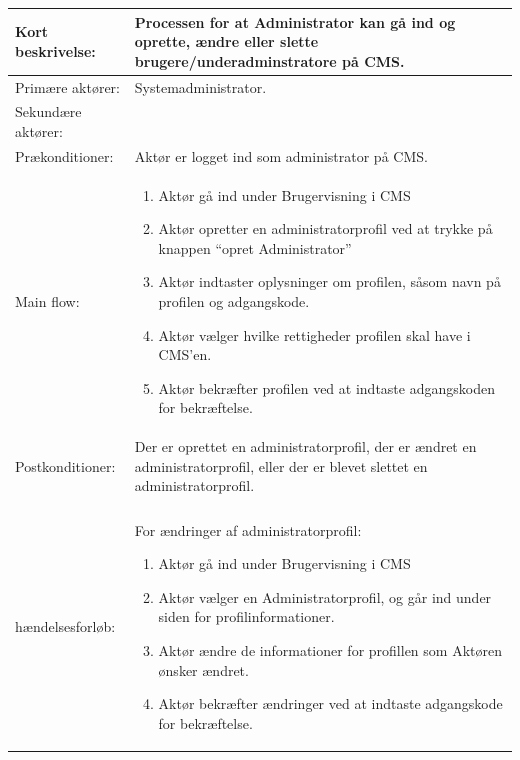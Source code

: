 \begin{table}[t]
\begin{tabular}{|p{3cm}|p{14cm}|}
        \hline
        Kort beskrivelse: & Processen for at Administrator kan gå ind og oprette, ændre eller slette brugere/underadminstratore på CMS. \\ 
        \hline
        Primære aktører: & Systemadministrator. \\ 
        \hline
        Sekundære aktører: &  \\ 
        \hline
        Prækonditioner: & Aktør er logget ind som administrator på CMS. \\ 
        \hline
        Main flow: &  
        \begin{minipage}{14cm}
        	\begin{enumerate}
        	\item Aktør gå ind under Brugervisning i CMS
            \item Aktør opretter en administratorprofil ved at trykke på knappen “opret Administrator”
            \item Aktør indtaster oplysninger om profilen, såsom navn på profilen og adgangskode.
            \item Aktør vælger hvilke rettigheder profilen skal have i CMS’en.
            \item Aktør bekræfter profilen ved at indtaste adgangskoden for bekræftelse.
        	\end{enumerate}
        \end{minipage} \par \\ 
        \hline
        Postkonditioner: & Der er oprettet en administratorprofil, der er ændret en administratorprofil, eller der er blevet slettet en administratorprofil. \\
        \hline
        \begin{minipage}{3cm} Alternative \\ hændelsesforløb:
        \end{minipage}
        & \begin{minipage}{14cm}
        	For ændringer af administratorprofil:
        	\begin{enumerate}
              \item Aktør gå ind under Brugervisning i CMS
              \item Aktør vælger en Administratorprofil, og går ind under siden for profilinformationer.
              \item Aktør ændre de informationer for profillen som Aktøren ønsker ændret.
              \item Aktør bekræfter ændringer ved at indtaste adgangskode for bekræftelse.

\end{enumerate}
\end{minipage}
\end{tabular}
\end{table}
